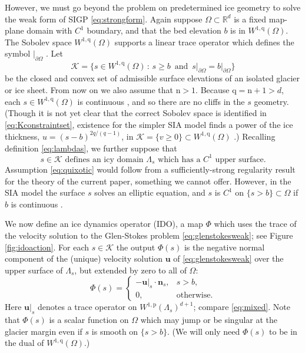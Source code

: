\documentclass[letterpaper,final,12pt,reqno]{amsart}
\theoremstyle{claim}
\newcommand{\RR}{\mathbb{R}}
\newcommand{\bn}{\mathbf{n}}
\newcommand{\bu}{\mathbf{u}}
\newcommand{\nn}{{\text{n}}}
\newcommand{\pp}{{\text{p}}}
\newcommand{\qq}{{\text{q}}}
\numberwithin{equation}{section}
\numberwithin{figure}{section}
\numberwithin{table}{section}
\numberwithin{theorem}{section}
\begin{document}
However, we must go beyond the problem on predetermined ice geometry to solve the weak form of SIGP \eqref{eq:strongform}.  Again suppose $\Omega \subset \RR^d$ is a fixed map-plane domain with $C^1$ boundary, and that the bed elevation $b$ is in $W^{1,\qq}(\Omega)$.  The Sobolev space $W^{1,\qq}(\Omega)$ supports a linear trace operator which defines the symbol $|_{\partial \Omega}$ \cite[Section 5.5]{Evans2010}.  Let
\begin{equation}
\mathcal{K} = \{s \in W^{1,\qq}(\Omega) \,:\, s \ge b \, \text{ and } \, s\big|_{\partial\Omega} = b\big|_{\partial\Omega}\}  \label{eq:Kconstraintset}
\end{equation}
be the closed and convex set of admissible surface elevations of an isolated glacier or ice sheet.  From now on we also assume that $\nn>1$.  Because $\qq = \nn+1 > d$, each $s \in W^{1,\qq}(\Omega)$ is continuous \cite[Morrey's inequality, section 5.6.2]{Evans2010}, and so there are no cliffs in the $s$ geometry.  (Though it is not yet clear that the correct Sobolev space is identified in \eqref{eq:Kconstraintset}, existence for the simpler SIA model finds a power of the ice thickness, $u=(s-b)^{2q/(q-1)}$, in $\mathcal{K} = \{v \ge 0\} \subset W^{1,\qq}(\Omega)$ \cite{JouvetBueler2012}.)  Recalling definition \eqref{eq:lambdas}, we further suppose that
\begin{equation}
s\in \mathcal{K} \text{ defines an icy domain } \Lambda_s \text{ which has a $C^1$ upper surface.} \label{eq:quixotic}
\end{equation}
Assumption \eqref{eq:quixotic} would follow from a sufficiently-strong regularity result for the theory of the current paper, something we cannot offer.  However, in the SIA model the surface $s$ solves an elliptic equation, and $s$ is $C^1$ on $\{s>b\} \subset \Omega$ if $b$ is continuous \cite{JouvetBueler2012}.

We now define an ice dynamics operator (IDO), a map $\Phi$ which uses the trace of the velocity solution to the Glen-Stokes problem \eqref{eq:glenstokesweak}; see Figure \ref{fig:idoaction}.  For each $s \in \mathcal{K}$ the output $\Phi(s)$ is the negative normal component of the (unique) velocity solution $\bu$ of \eqref{eq:glenstokesweak} over the upper surface of $\Lambda_s$, but extended by zero to all of $\Omega$:
\begin{equation}
\Phi(s) = \begin{cases} - \bu|_s \cdot \bn_s, & s > b, \\
                        0, & \text{otherwise}. \end{cases} \label{eq:ido}
\end{equation}
Here $\bu|_s$ denotes a trace operator on $W^{1,\pp}(\Lambda_s)^{d+1}$; compare \eqref{eq:mixed}.  Note that $\Phi(s)$ is a scalar function on $\Omega$ which may jump or be singular at the glacier margin even if $s$ is smooth on $\{s>b\}$.  (We will only need $\Phi(s)$ to be in the dual of $W^{1,\qq}(\Omega)$.)
\end{document}
